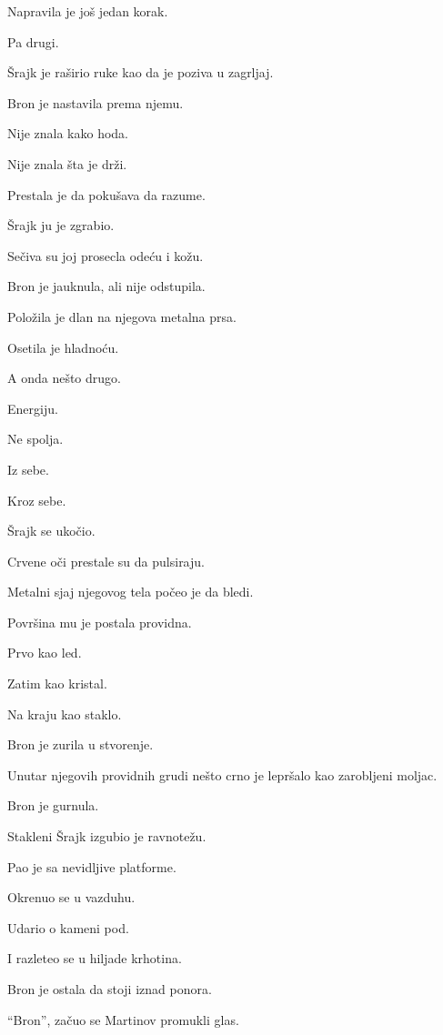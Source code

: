 \bigskip

Napravila je još jedan korak.

Pa drugi.

Šrajk je raširio ruke kao da je poziva u zagrljaj.

Bron je nastavila prema njemu.

Nije znala kako hoda.

Nije znala šta je drži.

Prestala je da pokušava da razume.

\bigskip

Šrajk ju je zgrabio.

Sečiva su joj prosecla odeću i kožu.

Bron je jauknula, ali nije odstupila.

Položila je dlan na njegova metalna prsa.

Osetila je hladnoću.

A onda nešto drugo.

Energiju.

Ne spolja.

Iz sebe.

Kroz sebe.

\bigskip

Šrajk se ukočio.

Crvene oči prestale su da pulsiraju.

Metalni sjaj njegovog tela počeo je da bledi.

Površina mu je postala providna.

Prvo kao led.

Zatim kao kristal.

Na kraju kao staklo.

Bron je zurila u stvorenje.

Unutar njegovih providnih grudi nešto crno je lepršalo kao zarobljeni moljac.

\bigskip

Bron je gurnula.

Stakleni Šrajk izgubio je ravnotežu.

Pao je sa nevidljive platforme.

Okrenuo se u vazduhu.

Udario o kameni pod.

I razleteo se u hiljade krhotina.

\bigskip

Bron je ostala da stoji iznad ponora.

``Bron'', začuo se Martinov promukli glas.

